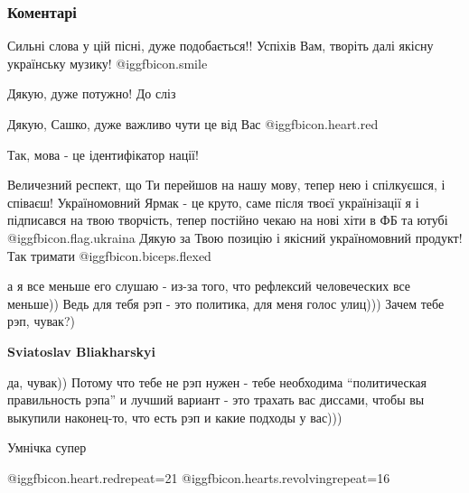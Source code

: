  
 
 
 
 
\subsubsection{Коментарі}

\begin{itemize} %
Сильні слова у цій пісні, дуже подобається!! Успіхів Вам, творіть далі якісну українську музику! @igg{fbicon.smile} 

Дякую, дуже потужно! До сліз

Дякую, Сашко, дуже важливо чути це від Вас @igg{fbicon.heart.red}


Так, мова - це ідентифікатор нації!

Величезний респект, що Ти перейшов на нашу мову, тепер нею і спілкуєшся, і
співаєш! Україномовний Ярмак - це круто, саме після твоєї українізації я і
підписався на твою творчість, тепер постійно чекаю на нові хіти в ФБ та ютубі
@igg{fbicon.flag.ukraina} Дякую за Твою позицію і якісний україномовний
продукт! Так тримати  @igg{fbicon.biceps.flexed} 

\begin{itemize} %

а я все меньше его слушаю - из-за того, что рефлексий человеческих все меньше))
Ведь для тебя рэп - это политика, для меня голос улиц))) Зачем тебе рэп,
чувак?)

\textbf{Sviatoslav Bliakharskyi} 

да, чувак)) Потому что тебе не рэп нужен - тебе необходима \enquote{политическая
правильность рэпа} и лучший вариант - это трахать вас диссами, чтобы вы
выкупили наконец-то, что есть рэп и какие подходы у вас)))

\end{itemize} %

Умнічка супер

@igg{fbicon.heart.red}{repeat=21} 
@igg{fbicon.hearts.revolving}{repeat=16} 


\end{itemize}
